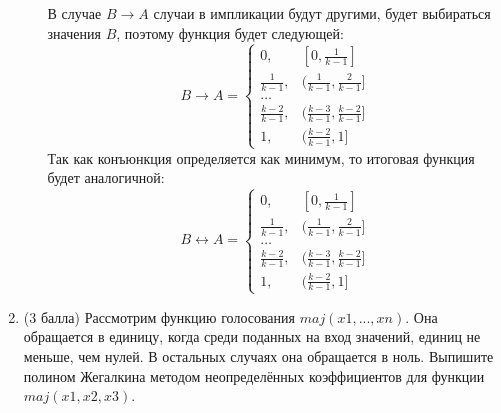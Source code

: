 \begin{enumerate}
\begin{enumerate}
\begin{solution}
      В случае $B\rightarrow A$ случаи в импликации будут другими, будет выбираться значения $B$, поэтому функция будет следующей:
      \begin{equation}
        B\rightarrow A =
        \begin{cases}
          0, & [0, \frac{1}{k-1}] \\
          \frac{1}{k-1}, & (\frac{1}{k-1}, \frac{2}{k-1}] \\
          \dots \\
          \frac{k-2}{k-1}, & (\frac{k-3}{k-1}, \frac{k-2}{k-1}] \\
          1, & (\frac{k-2}{k-1}, 1]
        \end{cases}
      \end{equation}
      Так как конъюнкция определяется как минимум, то итоговая функция будет аналогичной:
      \begin{equation}
        B\leftrightarrow A =
        \begin{cases}
          0, & [0, \frac{1}{k-1}] \\
          \frac{1}{k-1}, & (\frac{1}{k-1}, \frac{2}{k-1}] \\
          \dots \\
          \frac{k-2}{k-1}, & (\frac{k-3}{k-1}, \frac{k-2}{k-1}] \\
          1, & (\frac{k-2}{k-1}, 1]
        \end{cases}
      \end{equation}
    \end{solution}
  \end{enumerate}
  \item (3 балла) Рассмотрим функцию голосования $maj(x1, ..., xn)$. Она обращается в единицу, когда среди поданных на вход значений, единиц не меньше, чем нулей. В остальных случаях она обращается в ноль. Выпишите полином Жегалкина методом неопределённых коэффициентов для функции $maj(x1, x2, x3)$.
\end{enumerate}

\clearpage
